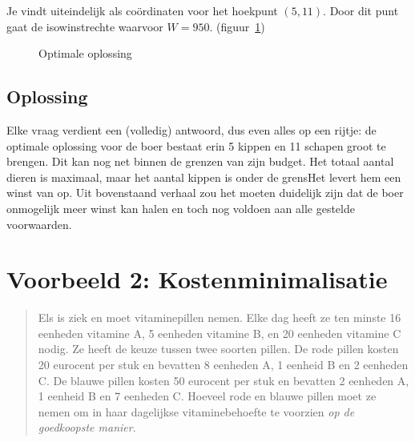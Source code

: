 Je vindt uiteindelijk als co\"{o}rdinaten voor het hoekpunt $(5,
11)$. Door dit punt gaat de isowinstrechte waarvoor $W= 950$.
(figuur~\ref{fig:maxwinstrechte})
\begin{figure}[htbp]
    \centering
{}
     \caption{Optimale oplossing}
    \label{fig:maxwinstrechte}
\end{figure}




\subsection{Oplossing}
Elke vraag verdient een (volledig) antwoord, dus even alles op
een rijtje: de optimale oplossing voor de boer bestaat erin 5 kippen en 11
schapen groot te brengen. Dit kan nog net binnen de grenzen van
zijn budget. Het totaal aantal dieren is maximaal, maar het aantal kippen is onder de grensHet levert hem een winst van  op. Uit
bovenstaand verhaal zou het moeten duidelijk zijn dat de boer
onmogelijk meer winst kan halen en toch nog voldoen aan alle
gestelde voorwaarden.





\newpage
\section{Voorbeeld 2: Kostenminimalisatie}\label{sec.minprob}

\begin{quote}
    Els is ziek en moet vitaminepillen nemen. Elke dag heeft ze ten minste
    16 eenheden vitamine A, 5 eenheden vitamine B, en 20 eenheden
    vitamine C nodig. Ze heeft de keuze tussen twee soorten pillen.
    De rode pillen kosten 20 eurocent per stuk en bevatten 8 eenheden
    A, 1 eenheid B en 2 eenheden C. De blauwe pillen kosten 50 eurocent
    per stuk en bevatten 2 eenheden A, 1 eenheid B en 7 eenheden
    C. Hoeveel rode en blauwe pillen moet ze nemen om in haar dagelijkse
    vitaminebehoefte te voorzien \emph{op de goedkoopste manier}.
\end{quote}



